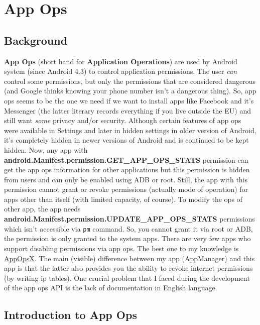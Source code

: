 \chapter{App Ops}\label{ch:app-ops} %
\section{Background}\label{sec:app-ops-background} %
\textbf{App Ops} (short hand for \textbf{Application Operations}) are used by Android system (since Android 4.3) to
control application permissions. The user \emph{can} control some permissions, but only the permissions that are considered
dangerous (and Google thinks knowing your phone number isn't a dangerous thing). So, app ops seems to be the one we need
if we want to install apps like Facebook and it's Messenger (the latter literary records everything if you live outside
the EU) and still want \emph{some} privacy and/or security. Although certain features of app ops were available in
Settings and later in hidden settings in older version of Android, it's completely hidden in newer versions of Android
and is continued to be kept hidden. Now, any app with \textbf{android.Manifest.permission.GET\_APP\_OPS\_STATS}
permission can get the app ops information for other applications but this permission is hidden from users and can only
be enabled using ADB or root. Still, the app with this permission cannot grant or revoke permissions (actually mode of
operation) for apps other than itself (with limited capacity, of course). To modify the ops of other app, the app needs
\textbf{android.Manifest.permission.UPDATE\_APP\_OPS\_STATS} permissions which isn't accessible via \texttt{pm} command.
So, you cannot grant it via root or ADB, the permission is only granted to the system apps. There are very few apps who
support disabling permissions via app ops. The best one to my knowledge is
\href{https://github.com/8enet/AppOpsX}{AppOpsX}. The main (visible) difference between my app (AppManager) and this
app is that the latter also provides you the ability to revoke internet permissions (by writing ip tables). One crucial
problem that I faced during the development of the app ops API is the lack of documentation in English language.

\section{Introduction to App Ops}\label{sec:introduction-to-app-ops} %

